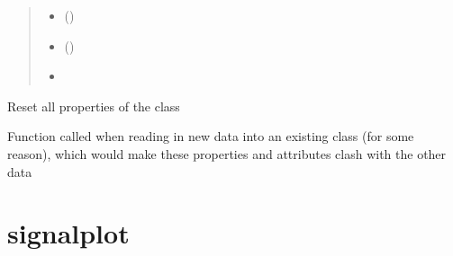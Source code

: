 \documentclass[letterpaper,10pt,english]{sphinxmanual}
\begin{document}
\begin{fulllineitems}
\begin{fulllineitems}
\begin{quote}
\begin{description}
\begin{itemize}
\item {} 
\sphinxAtStartPar
{} (\sphinxstyleliteralemphasis{\sphinxupquote{\#}}) \textendash{} 

\item {} 
\sphinxAtStartPar
{} () \textendash{} 

\item {} 
\sphinxAtStartPar
{} \textendash{} 

\end{itemize}

\end{description}\end{quote}

\end{fulllineitems}


\begin{fulllineitems}
\label{\detokenize{_autosummary/signalanalysis.vcg.Vcg:signalanalysis.vcg.Vcg.reset}}
\sphinxAtStartPar
Reset all properties of the class

\sphinxAtStartPar
Function called when reading in new data into an existing class (for some reason), which would make these
properties and attributes clash with the other data

\end{fulllineitems}


\end{fulllineitems}



\section{signalplot}
\label{\detokenize{_autosummary/signalplot:module-signalplot}}\label{\detokenize{_autosummary/signalplot:signalplot}}\label{\detokenize{_autosummary/signalplot::doc}}
\end{document}
